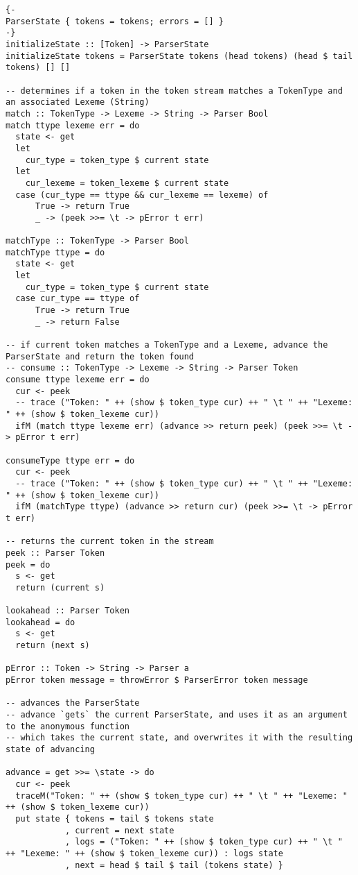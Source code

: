 \documentclass[11pt]{article}
\begin{document}
\begin{verbatim}
{-
ParserState { tokens = tokens; errors = [] }
-}
initializeState :: [Token] -> ParserState
initializeState tokens = ParserState tokens (head tokens) (head $ tail tokens) [] []

-- determines if a token in the token stream matches a TokenType and an associated Lexeme (String)
match :: TokenType -> Lexeme -> String -> Parser Bool
match ttype lexeme err = do
  state <- get
  let
    cur_type = token_type $ current state
  let
    cur_lexeme = token_lexeme $ current state
  case (cur_type == ttype && cur_lexeme == lexeme) of
      True -> return True
      _ -> (peek >>= \t -> pError t err)

matchType :: TokenType -> Parser Bool
matchType ttype = do
  state <- get
  let
    cur_type = token_type $ current state
  case cur_type == ttype of
      True -> return True
      _ -> return False

-- if current token matches a TokenType and a Lexeme, advance the ParserState and return the token found
-- consume :: TokenType -> Lexeme -> String -> Parser Token
consume ttype lexeme err = do
  cur <- peek
  -- trace ("Token: " ++ (show $ token_type cur) ++ " \t " ++ "Lexeme: " ++ (show $ token_lexeme cur))
  ifM (match ttype lexeme err) (advance >> return peek) (peek >>= \t -> pError t err)

consumeType ttype err = do
  cur <- peek
  -- trace ("Token: " ++ (show $ token_type cur) ++ " \t " ++ "Lexeme: " ++ (show $ token_lexeme cur))
  ifM (matchType ttype) (advance >> return cur) (peek >>= \t -> pError t err)

-- returns the current token in the stream
peek :: Parser Token
peek = do
  s <- get
  return (current s)

lookahead :: Parser Token
lookahead = do
  s <- get
  return (next s)

pError :: Token -> String -> Parser a
pError token message = throwError $ ParserError token message

-- advances the ParserState
-- advance `gets` the current ParserState, and uses it as an argument to the anonymous function
-- which takes the current state, and overwrites it with the resulting state of advancing

advance = get >>= \state -> do
  cur <- peek
  traceM("Token: " ++ (show $ token_type cur) ++ " \t " ++ "Lexeme: " ++ (show $ token_lexeme cur))
  put state { tokens = tail $ tokens state
            , current = next state
            , logs = ("Token: " ++ (show $ token_type cur) ++ " \t " ++ "Lexeme: " ++ (show $ token_lexeme cur)) : logs state
            , next = head $ tail $ tail (tokens state) }


\end{verbatim}
\end{document}
